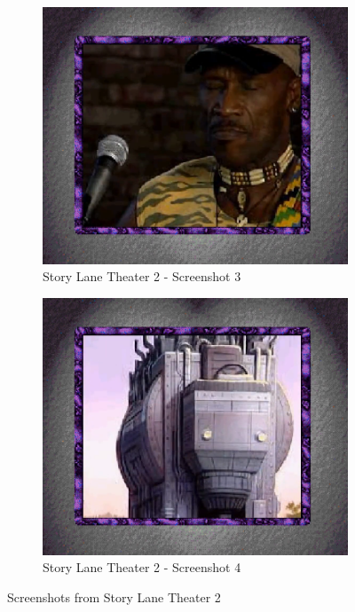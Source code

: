 \begin{figure}[H]
    \begin{subfigure}{0.45\textwidth}
        \centering
        \includegraphics[width=\linewidth]{Games/StoryLaneTheater/Images/StoryLaneTheater2Image3.png}
        \caption{Story Lane Theater 2 - Screenshot 3}
    \end{subfigure}
    \begin{subfigure}{0.45\textwidth}
        \centering
        \includegraphics[width=\linewidth]{Games/StoryLaneTheater/Images/StoryLaneTheater2Image4.png}
        \caption{Story Lane Theater 2 - Screenshot 4}
    \end{subfigure}
    \caption{Screenshots from Story Lane Theater 2}
\end{figure}